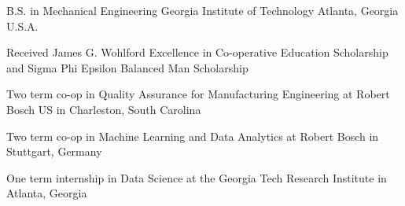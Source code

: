 

\begin{cventries}

  \cventry
    {B.S. in Mechanical Engineering} %
    {Georgia Institute of Technology} %
    {} %
    {Atlanta, Georgia U.S.A.} %
    {
      \begin{cvitems} %
        \item {Received James G. Wohlford Excellence in Co-operative Education Scholarship and Sigma Phi Epsilon Balanced Man Scholarship}
        \item {Two term co-op in Quality Assurance for Manufacturing Engineering at Robert Bosch US in Charleston, South Carolina}
        \item {Two term co-op in Machine Learning and Data Analytics at Robert Bosch in Stuttgart, Germany}
        \item {One term internship in Data Science at the Georgia Tech Research Institute in Atlanta, Georgia}
      \end{cvitems}
    }

\end{cventries}
